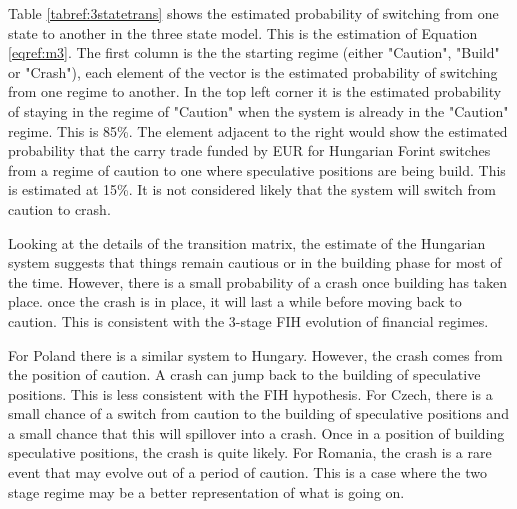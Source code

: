 \documentclass[12pt, a4paper, oneside]{article} %
\begin{document}
Table \ref{tabref:3statetrans} shows the estimated probability of switching from one state to another in the three state model.  This is the estimation of Equation \ref{eqref:m3}.  The first column is the  the starting regime (either "Caution", "Build" or "Crash"), each element of the vector is the estimated probability of switching from one regime to another. In the top left corner it is the estimated probability of staying in the regime of "Caution" when the system is already in the "Caution" regime.  This is 85\%.  The element adjacent to the right would show the estimated probability that the carry trade funded by EUR for Hungarian Forint switches from a regime of caution to one where speculative positions are being build.  This is estimated at 15\%.  It is not considered likely that the system will switch from caution to crash.  

Looking at the details of the transition matrix, the estimate of the Hungarian system suggests that things remain cautious or in the building phase for most of the time.  However, there is a small probability of a crash once building has taken place. once the crash is in place, it will last a while before moving back to caution. This is consistent with the 3-stage FIH evolution of financial regimes. 

For Poland there is a similar system to Hungary.  However, the crash comes from the position of caution.  A crash can jump back to the building of speculative positions.  This is less consistent with the FIH hypothesis. For Czech, there is a small chance of a switch from caution to the building of speculative positions and a small chance that this will spillover into a crash. Once in a position of building speculative positions, the crash is quite likely.  For Romania, the crash is a rare event that may evolve out of a period of caution. This is a case where the two stage regime may be a better representation of what is going on. 
\end{document}
